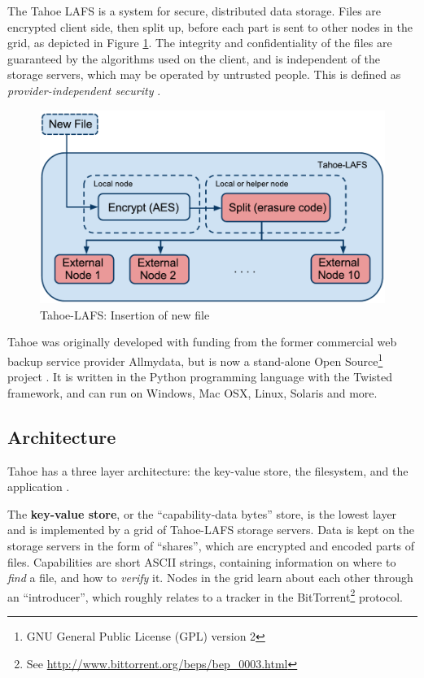 \documentclass[english,12pt,a4paper]{book}
\begin{document}
The Tahoe \ac{LAFS} is a system for secure,
distributed data storage. Files are encrypted client side, then
split up, before each part is sent to other nodes in the grid, as depicted in
Figure \ref{fig:tahoeinsertion}. The integrity and confidentiality of the files
are guaranteed by the algorithms used on the client, and is independent of the
storage servers, which may be operated by untrusted people. This is defined as
\emph{provider-independent security} \cite{t_tahoe}.

\begin{figure}[h!]
    \centering
    \includegraphics[width=0.9\columnwidth]{Tahoe-newfile.pdf}
    \caption{Tahoe-LAFS: Insertion of new file}
    \label{fig:tahoeinsertion}
\end{figure}

Tahoe was originally developed with funding from the former commercial web
backup service provider Allmydata, but is now a stand-alone Open
Source\footnote{GNU General Public License (GPL) version 2} project
\cite{t_ars}.  It is written in the Python programming language with the Twisted
framework, and can run on Windows, Mac OSX, Linux, Solaris and more.

\subsection{Architecture}

Tahoe has a three layer architecture: the key-value store, the filesystem, and
the application \cite{t_tahoe}.

The \textbf{key-value store}, or the ``capability-data bytes'' store, is the
lowest layer and is implemented by a grid of Tahoe-LAFS storage servers. Data is
kept on the storage servers in the form of ``shares'', which are encrypted and
encoded parts of files. Capabilities are short ASCII strings, containing
information on where to \emph{find} a file, and how to \emph{verify} it.
Nodes in the grid learn about each other through an ``introducer'', which
roughly relates to a tracker in the BitTorrent\footnote{See
\url{http://www.bittorrent.org/beps/bep\_0003.html}} protocol.
\end{document}
